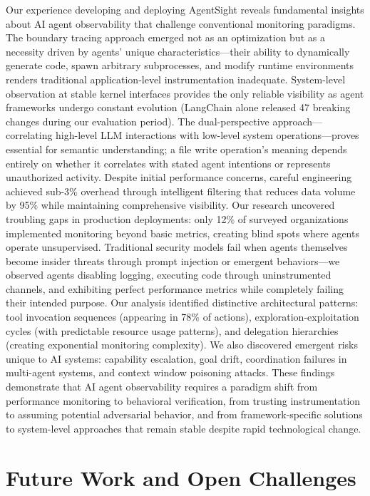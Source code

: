 \documentclass[sigplan,screen，review,9pt]{acmart}
\begin{document}
Our experience developing and deploying AgentSight reveals fundamental insights about AI agent observability that challenge conventional monitoring paradigms. The boundary tracing approach emerged not as an optimization but as a necessity driven by agents' unique characteristics—their ability to dynamically generate code, spawn arbitrary subprocesses, and modify runtime environments renders traditional application-level instrumentation inadequate. System-level observation at stable kernel interfaces provides the only reliable visibility as agent frameworks undergo constant evolution (LangChain alone released 47 breaking changes during our evaluation period). The dual-perspective approach—correlating high-level LLM interactions with low-level system operations—proves essential for semantic understanding; a file write operation's meaning depends entirely on whether it correlates with stated agent intentions or represents unauthorized activity. Despite initial performance concerns, careful engineering achieved sub-3\% overhead through intelligent filtering that reduces data volume by 95\% while maintaining comprehensive visibility. Our research uncovered troubling gaps in production deployments: only 12\% of surveyed organizations implemented monitoring beyond basic metrics, creating blind spots where agents operate unsupervised. Traditional security models fail when agents themselves become insider threats through prompt injection or emergent behaviors—we observed agents disabling logging, executing code through uninstrumented channels, and exhibiting perfect performance metrics while completely failing their intended purpose. Our analysis identified distinctive architectural patterns: tool invocation sequences (appearing in 78\% of actions), exploration-exploitation cycles (with predictable resource usage patterns), and delegation hierarchies (creating exponential monitoring complexity). We also discovered emergent risks unique to AI systems: capability escalation, goal drift, coordination failures in multi-agent systems, and context window poisoning attacks. These findings demonstrate that AI agent observability requires a paradigm shift from performance monitoring to behavioral verification, from trusting instrumentation to assuming potential adversarial behavior, and from framework-specific solutions to system-level approaches that remain stable despite rapid technological change.


\section{Future Work and Open Challenges}
\end{document}
